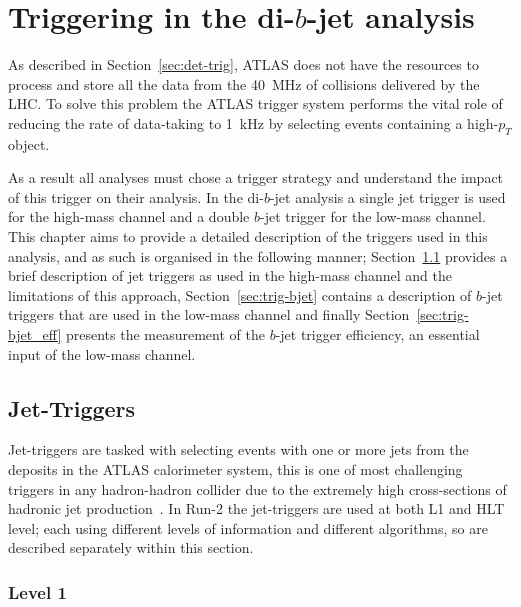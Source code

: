 \chapter{Triggering in the di-$b$-jet analysis}
\label{sec:trig}

As described in Section~\ref{sec:det-trig},
ATLAS does not have the resources to process and store all the data from the 40~MHz of collisions delivered by the LHC.
To solve this problem the ATLAS trigger system performs the vital role of
reducing the rate of data-taking to 1~kHz by selecting events containing a high-$p_T$ object. 

As a result all analyses must chose a trigger strategy and understand the impact of this trigger on their analysis.
In the di-$b$-jet analysis a single jet trigger is used for the high-mass channel
and a double $b$-jet trigger for the low-mass channel.
This chapter aims to provide a detailed description of the triggers used in this analysis,
and as such is organised in the following manner;
Section~\ref{sec:trig-jet} provides a brief description of jet triggers as used in the high-mass channel and the limitations of this approach,
Section~\ref{sec:trig-bjet} contains a description of $b$-jet triggers that are used in the low-mass channel
and finally Section~\ref{sec:trig-bjet_eff} presents the measurement of the $b$-jet trigger efficiency, an essential input of the low-mass channel.

\section{Jet-Triggers}
\label{sec:trig-jet}

Jet-triggers are tasked with selecting events with one or more jets from the deposits in the ATLAS calorimeter system,
this is one of most challenging triggers in any hadron-hadron collider due to the extremely high cross-sections of hadronic jet production~\cite{trig-run2_proc}.
In Run-2 the jet-triggers are used at both L1 and HLT level; each using different levels of information and different algorithms,
so are described separately within this section.

\subsection{Level 1}

